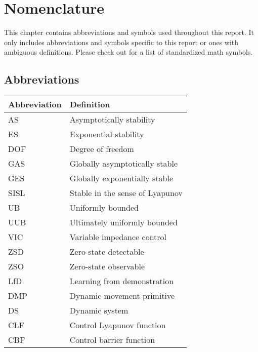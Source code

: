 \chapter*{Nomenclature}

This chapter contains abbreviations and symbols used throughout this report. It only includes abbreviations and symbols specific to this report or ones with ambiguous definitions. Please check out \cite{ListMathematicalSymbols2022} for a list of standardized math symbols.

\section*{Abbreviations}

\begin{longtable}{p{2.5cm}p{8cm}}
    \toprule
    Abbreviation & Definition                      \\
    \midrule\endhead %
    AS           & Asymptotically stability        \\
    ES           & Exponential stability           \\
    DOF          & Degree of freedom               \\
    GAS          & Globally asymptotically stable  \\
    GES          & Globally exponentially  stable  \\
    SISL         & Stable in the sense of Lyapunov \\
    UB           & Uniformly bounded               \\
    UUB          & Ultimately uniformly bounded    \\
    VIC          & Variable impedance control      \\
    ZSD          & Zero-state detectable           \\
    ZSO          & Zero-state observable           \\
    LfD          & Learning from demonstration     \\
    DMP          & Dynamic movement primitive      \\
    DS           & Dynamic system                  \\   
    CLF          & Control Lyapunov function       \\
    CBF          & Control barrier function        \\
    \bottomrule
\end{longtable}

